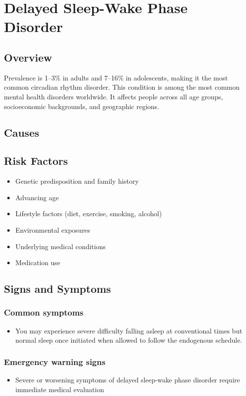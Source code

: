 \chapter{Delayed Sleep-Wake Phase Disorder}
\label{sec:Delayed Sleep-Wake Phase Disorder}

\section{Overview}
Prevalence is 1--3\% in adults and 7--16\% in adolescents, making it the most common circadian rhythm disorder. This condition is among the most common mental health disorders worldwide. It affects people across all age groups, socioeconomic backgrounds, and geographic regions.
\section{Causes}
\section{Risk Factors}

\begin{itemize}[noitemsep]
  \item Genetic predisposition and family history
  \item Advancing age
  \item Lifestyle factors (diet, exercise, smoking, alcohol)
  \item Environmental exposures
  \item Underlying medical conditions
  \item Medication use
\end{itemize}
\section{Signs and Symptoms}

\subsection{Common symptoms}
\begin{itemize}[noitemsep]
  \item You may experience severe difficulty falling asleep at conventional times but normal sleep once initiated when allowed to follow the endogenous schedule. 
  \end{itemize}

\subsection{Emergency warning signs}
\begin{itemize}[noitemsep]
  \item Severe or worsening symptoms of delayed sleep-wake phase disorder require immediate medical evaluation
\end{itemize}
